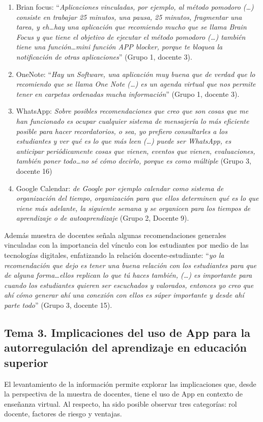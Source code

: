 \documentclass[spanish]{textolivre}
\begin{document}
\begin{enumerate}
    \item Brian focus: “\emph{Aplicaciones vinculadas, por ejemplo, al método pomodoro (…) consiste en trabajar 25 minutos, una pausa, 25 minutos, fragmentar una tarea, y eh…hay una aplicación que recomiendo mucho que se llama Brain Focus y que tiene el objetivo de ejecutar el método pomodoro (…) también tiene una función…mini función APP blocker, porque te bloquea la notificación de otras aplicaciones}” (Grupo 1, docente 3).
    \item OneNote: “\emph{Hay un Software, una aplicación muy buena que de verdad que lo recomiendo que se llama One Note (…) es un agenda virtual que nos permite tener en carpetas ordenadas mucha información}” (Grupo 1, docente 3).
    \item WhatsApp: \emph{Sobre posibles recomendaciones que creo que son cosas que me han funcionado es ocupar cualquier sistema de mensajería lo más eficiente posible para hacer recordatorios, o sea, yo prefiero consultarles a los estudiantes  y ver qué es lo que más leen (…) puede ser WhatsApp, es anticipar periódicamente cosas que vienen, eventos que vienen, evaluaciones, también poner todo…no sé cómo decirlo, porque es como múltiple} (Grupo 3, docente 16)
    \item Google Calendar: \emph{de Google por ejemplo calendar como sistema de organización del tiempo, organización para que ellos determinen qué es lo que viene más adelante, la siguiente semana y se organicen para los tiempos de aprendizaje o de autoaprendizaje} (Grupo 2, Docente 9).
\end{enumerate}

Además muestra de docentes señala algunas recomendaciones generales vinculadas con la importancia del vínculo con los  estudiantes por medio de las tecnologías digitales, enfatizando la relación docente-estudiante: “\emph{yo la recomendación que dejo es tener una buena relación con los estudiantes para que de alguna forma…ellos replican lo que tú haces también, (…) es importante para cuando los estudiantes quieren ser escuchados y valorados, entonces yo creo que ahí cómo generar ahí una conexión con ellos es súper importante y desde ahí parte todo}” (Grupo 3, docente 15).

\subsection{Tema 3. Implicaciones del uso de App para la autorregulación del aprendizaje en educación superior}
El levantamiento de la información permite explorar las implicaciones que, desde la perspectiva de la muestra de docentes, tiene el uso de App en contexto de enseñanza virtual. Al respecto, ha sido posible observar tres categorías: rol docente, factores de riesgo y ventajas.
\end{document}
